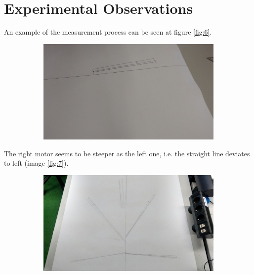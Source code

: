 \documentclass[10pt]{scrartcl}
\begin{document}
\section*{Experimental Observations}

An example of the measurement process can be seen at figure \ref{fig:6}. 

\begin{figure}[h!]
\centering
\caption{Measurement Process}
\label{fig:6}
  \begin{subfigure}[b]{0.4\textwidth}
    \includegraphics[width=\textwidth]{images/measurements}
  \end{subfigure}
\end{figure}

The right motor seems to be steeper as the left one, i.e. the straight line deviates to left (image \ref{fig:7}).

\begin{figure}[h!]
\centering
\caption{Experiments print}
\label{fig:7}
  \begin{subfigure}[b]{0.8\textwidth}
    \includegraphics[width=\textwidth]{images/print}
  \end{subfigure}
\end{figure}
\end{document}
